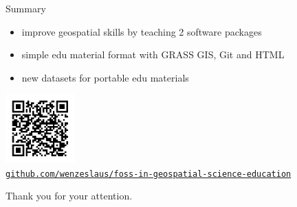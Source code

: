 \documentclass[xcolor={dvipsnames,usenames},beamer]{beamer}
\begin{document}
\begin{frame}{}

\begin{block}{Summary}
 \begin{itemize}
  \item improve geospatial skills by teaching 2 software packages
  \item simple edu material format with GRASS GIS, Git and HTML
  \item new datasets for portable edu materials
 \end{itemize}

\end{block}

\bigskip

\centering
\href{https://github.com/wenzeslaus/foss-in-geospatial-science-education}{%
\includegraphics[width=0.2\textwidth]{./images/general/slides_qr}\\%
\texttt{github.com/wenzeslaus/foss-in-geospatial-science-education}%
}

\bigskip

Thank you for your attention.

\end{frame}
\end{document}
